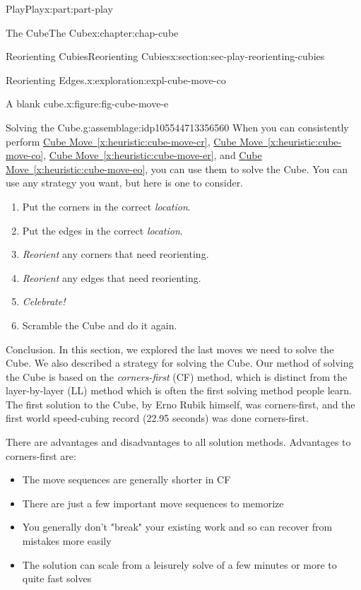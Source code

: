 \documentclass[oneside,10pt,]{book}
\newcommand{\xreffont}{\relax}
\numberwithin{equation}{section}
\begin{document}
\begin{partptx}{Play}{}{Play}{}{}{x:part:part-play}
\begin{chapterptx}{The Cube}{}{The Cube}{}{}{x:chapter:chap-cube}
\begin{sectionptx}{Reorienting Cubies}{}{Reorienting Cubies}{}{}{x:section:sec-play-reorienting-cubies}
\begin{exploration}{Reorienting Edges.}{x:exploration:expl-cube-move-co}
\begin{figureptx}{A blank cube.}{x:figure:fig-cube-move-e}{}
\begin{image}{0.25}{0.5}{0.25}
\end{image}%
\tcblower
\end{figureptx}%
\end{exploration}%
\begin{assemblage}{Solving the Cube.}{g:assemblage:idp105544713356560}%
When you can consistently perform \hyperref[x:heuristic:cube-move-cr]{Cube Move~{\xreffont\ref{x:heuristic:cube-move-cr}}}, \hyperref[x:heuristic:cube-move-co]{Cube Move~{\xreffont\ref{x:heuristic:cube-move-co}}}, \hyperref[x:heuristic:cube-move-er]{Cube Move~{\xreffont\ref{x:heuristic:cube-move-er}}}, and \hyperref[x:heuristic:cube-move-eo]{Cube Move~{\xreffont\ref{x:heuristic:cube-move-eo}}}, you can use them to solve the Cube. You can use any strategy you want, but here is one to consider.%
\begin{enumerate}
\item{}Put the corners in the correct \emph{location}.%
\item{}Put the edges in the correct \emph{location}.%
\item{}\emph{Reorient} any corners that need reorienting.%
\item{}\emph{Reorient} any edges that need reorienting.%
\item{}\emph{Celebrate!}%
\item{}Scramble the Cube and do it again.%
\end{enumerate}
%
\end{assemblage}
\begin{conclusion}{Conclusion.}%
In this section, we explored the last moves we need to solve the Cube. We also described a strategy for solving the Cube. Our method of solving the Cube is based on the \emph{corners-first} (CF) method, which is distinct from the layer-by-layer (LL) method which is often the first solving method people learn. The first solution to the Cube, by Erno Rubik himself, was corners-first, and the first world speed-cubing record (22.95 seconds) was done corners-first.%
\par
There are advantages and disadvantages to all solution methods. Advantages to corners-first are:%
\begin{itemize}[label=\textbullet]
\item{}The move sequences are generally shorter in CF%
\item{}There are just a few important move sequences to memorize%
\item{}You generally don't "break" your existing work and so can recover from mistakes more easily%
\item{}The solution can scale from a leisurely solve of a few minutes or more to quite fast solves%

\end{itemize}
\end{conclusion}
\end{sectionptx}
\end{chapterptx}
\end{partptx}
\end{document}
